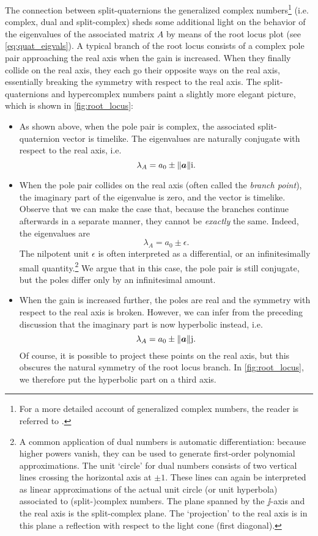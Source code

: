 The connection between split-quaternions the generalized complex numbers\footnote
{For a more detailed account of generalized complex numbers, the reader is referred to \citet{Harkin2004}.}
(i.e. complex, dual and split-complex)
sheds some additional light on the behavior of the eigenvalues of the associated matrix $A$ by means of the root locus plot (see \cref{eq:quat_eigvals}). A typical branch of the  root locus consists of a complex pole pair approaching the real axis when the gain is increased. When they finally collide on the real axis, they each go their opposite ways on the real axis, essentially breaking the symmetry with respect to the real axis. The split-quaternions and hypercomplex numbers paint a slightly more elegant picture, which is shown in \cref{fig:root_locus}:
\begin{itemize}
    \item As shown above, when the pole pair is complex, the associated split-quaternion vector is timelike. The eigenvalues are naturally conjugate with respect to the real axis, i.e.
        $$ \lambda_A = a_0 \pm \norm{\vec{a}}\ii.$$
    \item When the pole pair collides on the real axis (often called the \emph{branch point}), the imaginary part of the eigenvalue is zero, and the vector is timelike. Observe that we can make the case that, because the branches continue afterwards in a separate manner, they cannot be \emph{exactly} the same. Indeed, the eigenvalues are
        $$ \lambda_A = a_0 \pm \epsilon.$$
        The nilpotent unit $\epsilon$ is often interpreted as a differential, or an infinitesimally small quantity.\footnote{A common application of dual numbers is automatic differentiation: because higher powers vanish, they can be used to generate first-order polynomial approximations. The unit `circle' for dual numbers consists of two vertical lines crossing the horizontal axis at $\pm 1$. These lines can again be interpreted as linear approximations of the actual unit circle (or unit hyperbola) associated to (split-)complex numbers. The plane spanned by the $\jj$-axis and the real axis is the split-complex plane. The `projection' to the real axis is in this plane a reflection with respect to the light cone (first diagonal).} We argue that in this case, the pole pair is still conjugate, but the poles differ only by an infinitesimal amount.
    \item When the gain is increased further, the poles are real and the symmetry with respect to the real axis is broken. However, we can infer from the preceding discussion that the imaginary part is now hyperbolic instead, i.e.
        $$ \lambda_A = a_0 \pm \norm{\vec{a}}\jj. $$
        Of course, it is possible to project these points on the real axis, but this obscures the natural symmetry of the root locus branch. In \cref{fig:root_locus}, we therefore put the hyperbolic part on a third axis.
\end{itemize}

